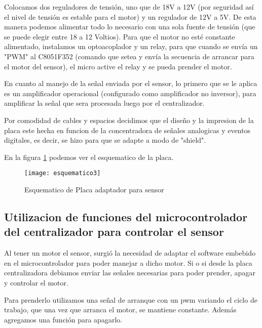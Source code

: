 \documentclass[a4paper]{article}
\begin{document}
Colocamos dos reguladores de tensión, uno que de 18V a 12V (por seguridad así el nivel de tensión es estable para el motor) y un regulador de 12V a 5V. De esta manera podemos alimentar todo lo necesario con una sola fuente de tensión (que se puede elegir entre 18 a 12 Voltios). Para que el motor no esté constante alimentado, instalamos un optoacoplador y un relay, para que cuando se envía un "PWM" al C8051F352 (comando que setea y envía la secuencia de arrancar para el motor del sensor), el micro active el relay y se pueda prender el motor. 

En cuanto al manejo de la señal enviada por el sensor, lo primero que se le aplica es un amplificador operacional (configurado como amplificador no inversor), para amplificar la señal que sera procesada luego por el centralizador. 

Por comodidad de cables y espacios decidimos que el diseño y la impresion de la placa este hecha en funcion de la concentradora de señales analogicas y eventos digitales, es decir, se hizo para que se adapte a modo de "shield".

En la figura \ref{fig:esquematico3} podemos ver el esquematico de la placa.

\begin{figure}[H]
  \centering
  \texttt{[image: esquematico3]}
  \caption{Esquematico de Placa adaptador para sensor}\label{fig:esquematico3}
\end{figure}




\subsection{Utilizacion de funciones del microcontrolador del centralizador para controlar el sensor} %
\label{sub:utilizacion_de_funciones_del_microcontrolador_del_centralizador_para_controlar_el_sensor}

Al tener un motor el sensor, surgió la necesidad de adaptar el software embebido en el microcontrolador para poder manejar a dicho motor. Si o si desde la placa centralizadora debiamos enviar las señales necesarias para poder prender, apagar y controlar el motor.

Para prenderlo utilizamos una señal de arranque con un pwm variando el ciclo de trabajo, que una vez que arranca el motor, se mantiene constante. Además agregamos una función para apagarlo.
\end{document}

